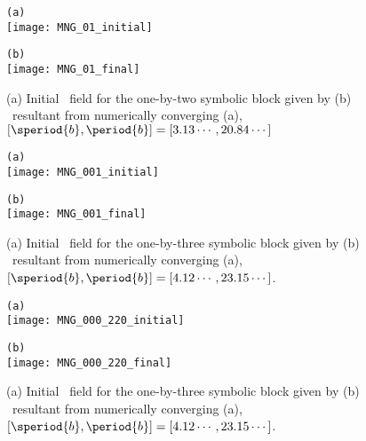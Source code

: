 

\begin{figure}
\begin{minipage}[height=.4\textheight]{.5\textwidth}
\centering \small{\texttt{(a)}}\\
\texttt{[image: MNG\_01\_initial]}
\end{minipage}
\begin{minipage}[height=.4\textheight]{.5\textwidth}
\centering \small{\texttt{(b)}}\\
\texttt{[image: MNG\_01\_final]}
\end{minipage}
\caption{ \label{fig:block01}
(a) Initial \spt\ field for the one-by-two symbolic block given by 
(b) \twoT\ resultant from numerically converging (a),
$[\speriod{b},\period{b}]=[3.13\cdots,20.84\cdots]$
}
\end{figure}

\begin{figure}
\begin{minipage}[height=.4\textheight]{.5\textwidth}
\centering \small{\texttt{(a)}}\\
\texttt{[image: MNG\_001\_initial]}
\end{minipage}
\begin{minipage}[height=.4\textheight]{.5\textwidth}
\centering \small{\texttt{(b)}}\\
\texttt{[image: MNG\_001\_final]}
\end{minipage}
\caption{ \label{fig:block001}
(a) Initial \spt\ field for the one-by-three symbolic block given by 
(b) \twoT\ resultant from numerically converging (a),
$[\speriod{b},\period{b}]=[4.12\cdots,23.15\cdots ]$.
}
\end{figure}




\begin{figure}
\begin{minipage}[height=.4\textheight]{.5\textwidth}
\centering \small{\texttt{(a)}}\\
\texttt{[image: MNG\_000\_220\_initial]}
\end{minipage}
\begin{minipage}[height=.4\textheight]{.5\textwidth}
\centering \small{\texttt{(b)}}\\
\texttt{[image: MNG\_000\_220\_final]}
\end{minipage}
\caption{ \label{fig:block001}
(a) Initial \spt\ field for the one-by-three symbolic block given by 
(b) \twoT\ resultant from numerically converging (a),
$[\speriod{b},\period{b}]=[4.12\cdots,23.15\cdots ]$.
}
\end{figure}

